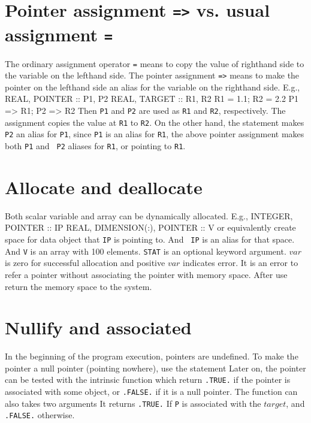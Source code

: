 {\section{Pointer assignment {\tt =>} vs. usual assignment {\tt =}}

The ordinary assignment operator {\tt =} means to copy the value of righthand 
side to the variable on the lefthand side.  The pointer assignment
{\tt =>} means to make the pointer on the lefthand side an alias for
the variable on the righthand side.  E.g.,
\ttbg
REAL, POINTER :: P1, P2
REAL, TARGET :: R1, R2
R1 = 1.1; R2 = 2.2
P1 => R1; P2 => R2
\tted
Then {\tt P1} and {\tt P2} are used as {\tt R1} and {\tt R2},
respectively.  The assignment 
\sms
{}
\sms
copies the value at {\tt R1} to {\tt R2}.  On the other hand, the statement
\sms
{}
\sms
makes {\tt P2} an alias for {\tt P1}, since {\tt P1} is an alias for
{\tt R1}, the above pointer assignment makes both {\tt P1} and {\tt
P2} aliases for {\tt R1}, or pointing to {\tt R1}.  

\section{Allocate and deallocate}
Both scalar variable and array can be dynamically allocated. E.g.,
\ttbg
INTEGER, POINTER :: IP
REAL, DIMENSION(:), POINTER :: V
\tted
{}
\sms
or equivalently
\sms
{}
\sms
create space for data object that {\tt IP} is pointing to.  And {\tt
IP} is an alias for that space.  And {\tt V} is an array with
100 elements.  {\tt STAT} is an optional keyword argument.
$var$ is zero for successful allocation and positive $var$ indicates
error. It is an error to refer a pointer
without associating the pointer with memory space.   After use
\sms
{}
\sms
return the memory space to the system.

\section{Nullify and associated}
In the beginning of the program execution, pointers are undefined.  
To make the pointer a null pointer (pointing nowhere), use the
statement 
\sms
{}
\sms
Later on, the pointer can be tested with the intrinsic function
\sms
{}
\sms
which return {\tt .TRUE.} if the pointer is associated with some
object, or {\tt .FALSE.} if it is a null pointer.   The function can
also takes two arguments
\sms
{}
\sms
It returns {\tt .TRUE.} If {\tt P} is associated with the $target$, and
{\tt .FALSE.} otherwise. 



}
